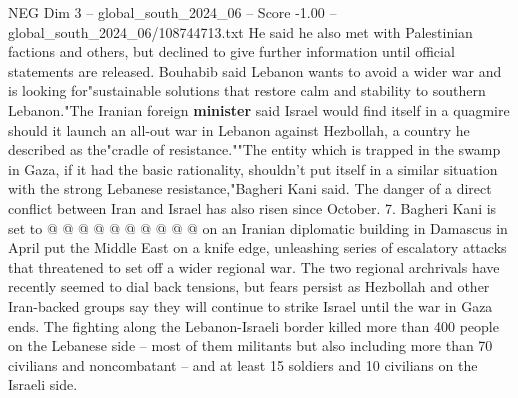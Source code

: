 \begin{textsample}{NEG Dim 3 – global\_south\_2024\_06 – Score -1.00 – global\_south\_2024\_06/108744713.txt}
He said he also met with Palestinian factions and others, but declined to give further information until official statements are released.
Bouhabib said Lebanon wants to avoid a wider war and is looking for"sustainable solutions that restore calm and stability to southern Lebanon."The Iranian foreign \textbf{minister} said Israel would find itself in a quagmire should it launch an all-out war in Lebanon against Hezbollah, a country he described as the"cradle of resistance.""The entity which is trapped in the swamp in Gaza, if it had the basic rationality, shouldn't put itself in a similar situation with the strong Lebanese resistance,"Bagheri Kani said.
The danger of a direct conflict between Iran and Israel has also risen since October. 7.
Bagheri Kani is set to @ @ @ @ @ @ @ @ @ @ on an Iranian diplomatic building in Damascus in April put the Middle East on a knife edge, unleashing series of escalatory attacks that threatened to set off a wider regional war.
The two regional archrivals have recently seemed to dial back tensions, but fears persist as Hezbollah and other Iran-backed groups say they will continue to strike Israel until the war in Gaza ends.
The fighting along the Lebanon-Israeli border killed more than 400 people on the Lebanese side -- most of them militants but also including more than 70 civilians and noncombatant -- and at least 15 soldiers and 10 civilians on the Israeli side.

\end{textsample}
